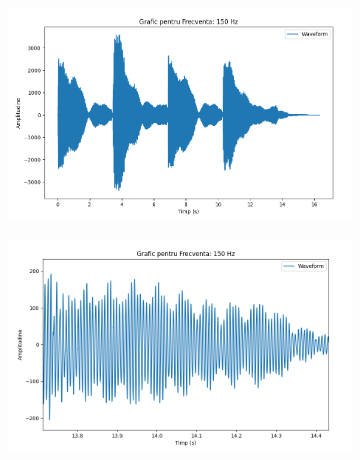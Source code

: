 \documentclass[12pt]{article}
\begin{document}
\newpage

\begin{figure}[H]
	\centering
	\begin{subfigure}[b]{1\textwidth}
		\includegraphics[width=\linewidth]{grafic3.png}
	\end{subfigure}
	\hfill
	\begin{subfigure}[b]{1\textwidth}
		\includegraphics[width=\linewidth]{grafic4.png}
	\end{subfigure}
\end{figure}

\newpage
\end{document}
